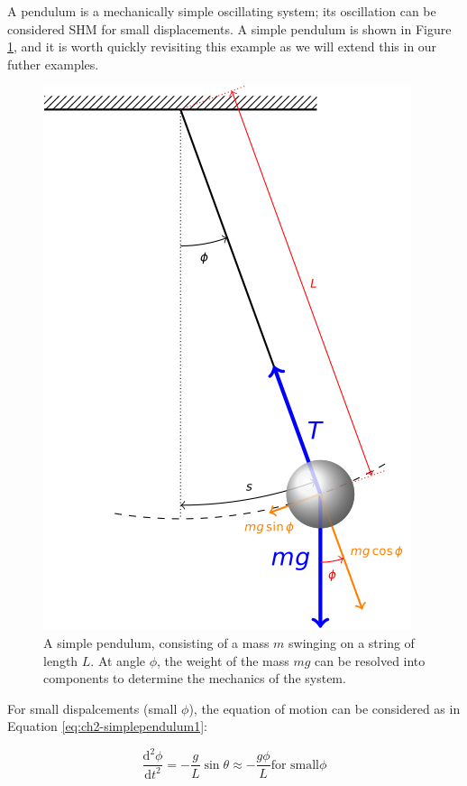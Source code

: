 \documentclass[
]{book}
\begin{document}
A pendulum is a mechanically simple oscillating system; its oscillation can be considered SHM for small displacements. A simple pendulum is shown in Figure \ref{fig:ch2-simplependulum1}, and it is worth quickly revisiting this example as we will extend this in our futher examples.

\begin{figure}

{\centering \includegraphics[width=0.7\linewidth]{visualisations/LaTeX/ch2-simplependulum1} 

}

\caption{A simple pendulum, consisting of a mass $m$ swinging on a string of length $L$. At angle $\phi$, the weight of the mass $mg$ can be resolved into components to determine the mechanics of the system.}\label{fig:ch2-simplependulum1}
\end{figure}

For small dispalcements (small \(\phi\)), the equation of motion can be considered as in Equation \eqref{eq:ch2-simplependulum1}:

\begin{equation}
\frac{\mathrm{d}^2 \phi}{\mathrm{d} t^2} = -\frac{g}{L}\sin \theta \approx -\frac{g \phi}{L} \textrm{for small} \phi
\label{eq:ch2-simplependulum1}
\end{equation}
\end{document}
